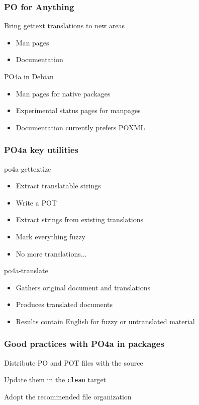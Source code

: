 \documentclass{beamer}
\begin{document}
\begin{frame}
  \frametitle{PO for Anything}
	\begin{block}
		{Bring gettext translations to new areas}
		\begin{itemize}
		\item
			Man pages
		\item
			Documentation
		\end{itemize}
	\end{block}
	\begin{block}
		{PO4a in Debian}
		\begin{itemize}
		\item
			Man pages for native packages
		\item
			Experimental status pages for manpages
		\item
			Documentation currently prefers POXML
		\end{itemize}
	\end{block}
\end{frame}

\begin{frame}
  \frametitle{PO4a key utilities}
	\begin{block}
		{po4a-gettextize}
		\begin{itemize}
		\item
			Extract translatable strings
		\item
			Write a POT
		\item
			Extract strings from existing translations
		\item
			Mark everything fuzzy
		\item
			No more translations...
		\end{itemize}
	\end{block}
	\begin{block}
		{po4a-translate}
		\begin{itemize}
		\item
			Gathers original document and translations
		\item
			Produces translated documents
		\item
			Results contain English for fuzzy or untranslated material
		\end{itemize}
	\end{block}
\end{frame}

\begin{frame}
  \frametitle{Good practices with PO4a in packages}
	\begin{block}
		{Distribute PO and POT files with the source}
	\end{block}
	\begin{block}
		{Update them in the \texttt{clean} target}
	\end{block}
	\begin{block}
		{Adopt the recommended file organization}
	\end{block}
\end{frame}
\end{document}

